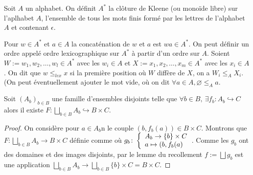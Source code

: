 \begin{definition}
Soit $A$ un alphabet. On définit $A^*$ la clôture de Kleene (ou monoïde libre) sur l'aplhabet $A$, l'ensemble de tous les mots finis formé par les lettres de l'alphabet $A$ et contenant $\epsilon$.    
\end{definition}

\begin{remarque}
    Pour $w\in A^*$ et $a\in A$ la concaténation de $w$ et $a$ est $wa\in A^*$.
     On peut définir un ordre appelé ordre lexicographique sur $A^*$ à partir d'un ordre sur $A$. Soient $W:=w_1, w_2,\dotsc,w_l\in A^*$  avec les $w_i\in A$ et $X:=x_1,x_2,\dotsc,x_m\in A^*$ avec les $x_i\in A$. On dit que $w\leq_{lex} x$ si la première position où $W$ diffère de $X$, on a $W_i\leq_A X_i$. (On peut éventuellement ajouter le mot vide, où on dit $\forall a \in A, \varnothing\leq_A a$.
\end{remarque}

\begin{lemme}
Soit $(A_b)_{b\in B}$ une famille d'ensembles disjoints telle que $\forall b\in B,\ \exists f_b : A_b\hookrightarrow C$ alors il existe $F:\bigsqcup_{b\in B}A_b\hookrightarrow B\times C$.
\end{lemme}
\begin{proof}
On considère pour $a\in A_b$n le couple $(b,f_b(a))\in B\times C$. Montrons que $F:\bigsqcup_{b\in B}A_b\to B\times C$ définie comme où $g_b\colon \left\{\begin{array}{l}A_b\to\{b\}\times C \\a\mapsto (b,f_b(a)\end{array}\right.$. Comme les $g_b$ ont des domaines et des images disjoints, par le lemme du recollement $f:=\bigsqcup g_b$ est une application $\bigsqcup_{b\in B}A_b\to \bigsqcup_{b\in B}\{b\}\times C = B\times C$. 
\end{proof}


